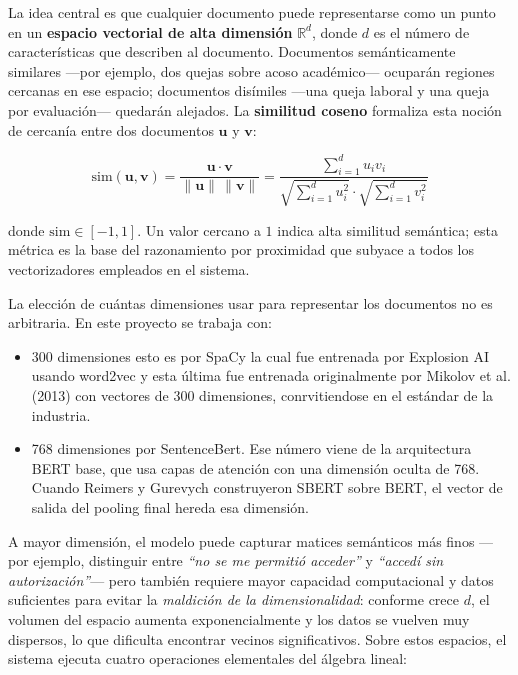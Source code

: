 La idea central es que cualquier documento puede representarse como un punto en
un \textbf{espacio vectorial de alta dimensión} $\mathbb{R}^d$, donde $d$ es el
número de características que describen al documento. Documentos semánticamente
similares —por ejemplo, dos quejas sobre acoso académico— ocuparán regiones
cercanas en ese espacio; documentos disímiles —una queja laboral y una queja por
evaluación— quedarán alejados. La \textbf{similitud coseno} formaliza esta noción
de cercanía entre dos documentos $\mathbf{u}$ y $\mathbf{v}$:

\begin{equation}
  \text{sim}(\mathbf{u}, \mathbf{v})
  = \frac{\mathbf{u} \cdot \mathbf{v}}{\|\mathbf{u}\| \, \|\mathbf{v}\|}
  = \frac{\displaystyle\sum_{i=1}^{d} u_i v_i}
         {\sqrt{\displaystyle\sum_{i=1}^{d} u_i^2}
          \cdot \sqrt{\displaystyle\sum_{i=1}^{d} v_i^2}}
  \label{eq:coseno}
\end{equation}

donde $\text{sim} \in [-1, 1]$. Un valor cercano a $1$ indica alta similitud
semántica; esta métrica es la base del razonamiento por proximidad que subyace
a todos los vectorizadores empleados en el sistema.

La elección de cuántas dimensiones usar para representar los documentos no es
arbitraria. En este proyecto se trabaja con:

\begin{itemize}
\item 300 dimensiones esto es por SpaCy la cual fue entrenada por Explosion AI usando word2vec y esta última fue entrenada originalmente por Mikolov et al. (2013) con vectores de 300 dimensiones, conrvitiendose en el estándar de la industria.
\item 768 dimensiones por SentenceBert. Ese número viene de la arquitectura BERT base, que usa capas de atención con una dimensión oculta de 768. Cuando Reimers y Gurevych construyeron SBERT sobre BERT, el vector de salida del pooling final hereda esa dimensión.
\end{itemize}

A mayor dimensión, el modelo puede
capturar matices semánticos más finos —por ejemplo, distinguir entre
\textit{``no se me permitió acceder''} y \textit{``accedí sin autorización''}—
pero también requiere mayor capacidad computacional y datos suficientes para
evitar la \textit{maldición de la dimensionalidad}: conforme crece $d$, el
volumen del espacio aumenta exponencialmente y los datos se vuelven muy dispersos,
lo que dificulta encontrar vecinos significativos. Sobre estos espacios, el
sistema ejecuta cuatro operaciones elementales del álgebra lineal:

